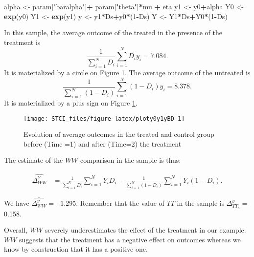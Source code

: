 \documentclass[]{book}
\newenvironment{Shaded}{\begin{snugshade}}{\end{snugshade}}
\newcommand{\KeywordTok}[1]{\textcolor[rgb]{0.13,0.29,0.53}{\textbf{#1}}}
\newcommand{\DecValTok}[1]{\textcolor[rgb]{0.00,0.00,0.81}{#1}}
\newcommand{\StringTok}[1]{\textcolor[rgb]{0.31,0.60,0.02}{#1}}
\newcommand{\OperatorTok}[1]{\textcolor[rgb]{0.81,0.36,0.00}{\textbf{#1}}}
\newcommand{\NormalTok}[1]{#1}
\theoremstyle{definition}
\theoremstyle{definition}
\theoremstyle{definition}
\theoremstyle{remark}
\begin{document}
\begin{Shaded}
\begin{Highlighting}[]
\NormalTok{alpha <-}\StringTok{ }\NormalTok{param[}\StringTok{"baralpha"}\NormalTok{]}\OperatorTok{+}\StringTok{  }\NormalTok{param[}\StringTok{"theta"}\NormalTok{]}\OperatorTok{*}\NormalTok{mu }\OperatorTok{+}\StringTok{ }\NormalTok{eta}
\NormalTok{y1 <-}\StringTok{ }\NormalTok{y0}\OperatorTok{+}\NormalTok{alpha}
\NormalTok{Y0 <-}\StringTok{ }\KeywordTok{exp}\NormalTok{(y0)}
\NormalTok{Y1 <-}\StringTok{ }\KeywordTok{exp}\NormalTok{(y1)}
\NormalTok{y <-}\StringTok{ }\NormalTok{y1}\OperatorTok{*}\NormalTok{Ds}\OperatorTok{+}\NormalTok{y0}\OperatorTok{*}\NormalTok{(}\DecValTok{1}\OperatorTok{-}\NormalTok{Ds)}
\NormalTok{Y <-}\StringTok{ }\NormalTok{Y1}\OperatorTok{*}\NormalTok{Ds}\OperatorTok{+}\NormalTok{Y0}\OperatorTok{*}\NormalTok{(}\DecValTok{1}\OperatorTok{-}\NormalTok{Ds)}
\end{Highlighting}
\end{Shaded}

In this sample, the average outcome of the treated in the presence of
the treatment is \[
\frac{1}{\sum_{i=1}^ND_i}\sum_{i=1}^ND_iy_i= 7.084.
\] It is materialized by a circle on Figure \ref{fig:ploty0y1yBD}. The
average outcome of the untreated is \[
\frac{1}{\sum_{i=1}^N(1-D_i)}\sum_{i=1}^N(1-D_i)y_i= 8.378.
\] It is materialized by a plus sign on Figure \ref{fig:ploty0y1yBD}.

\begin{figure}

{\centering \texttt{[image: STCI\_files/figure-latex/ploty0y1yBD-1]} 

}

\caption{Evolution of average outcomes in the treated and control group before (Time =1) and after (Time=2) the treatment}\label{fig:ploty0y1yBD}
\end{figure}

The estimate of the \(WW\) comparison in the sample is thus:

\begin{align*}
\hat{\Delta^Y_{WW}} & = \frac{1}{\sum_{i=1}^N D_i}\sum_{i=1}^N Y_iD_i-\frac{1}{\sum_{i=1}^N (1-D_i)}\sum_{i=1}^N Y_i(1-D_i).
\end{align*}

We have \(\hat{\Delta^y_{WW}}=\) -1.295. Remember that the value of
\(TT\) in the sample is \(\Delta^y_{TT_s}=\) 0.158.

Overall, \(WW\) severely underestimates the effect of the treatment in
our example. \(WW\) suggests that the treatment has a negative effect on
outcomes whereas we know by construction that it has a positive one.
\end{document}
